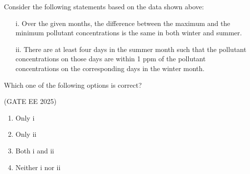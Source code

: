 \documentclass[journal,12pt,onecolumn]{IEEEtran}
\theoremstyle{remark}
\begin{document}
\begin{enumerate}
Consider the following statements based on the data shown above:
\begin{itemize}
    \item[i.]Over the given months, the difference between the maximum and the minimum pollutant concentrations is the same in both winter and summer.
    \item[ii.]There are at least four days in the summer month such that the pollutant concentrations on those days are within 1 ppm of the pollutant concentrations on the corresponding days in the winter month.
\end{itemize}

Which one of the following options is correct? 

\hfill(GATE EE 2025)

\begin{multicols}{4}
\begin{enumerate}
\item Only i
\item Only ii
\item Both i and ii
\item Neither i nor ii
\end{enumerate}
\end{multicols}
\end{enumerate}
\end{document}
